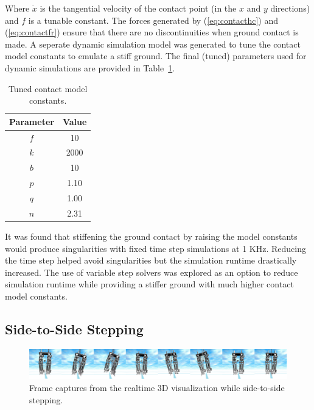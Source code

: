 Where $\dot x$ is the tangential velocity of the contact point (in the $x$ and $y$ directions) and $f$ is a tunable constant. The forces generated by (\ref{eq:contacthc}) and (\ref{eq:contactfr}) ensure that there are no discontinuities when ground contact is made. A seperate dynamic simulation model was generated to tune the contact model constants to emulate a stiff ground. The final (tuned) parameters used for dynamic simulations are provided in Table~\ref{tab:contactk}.

\begin{table}[!h]
  \centering
  \caption{Tuned contact model constants.}
    \begin{tabular}{cc}
    \addlinespace
    \toprule
    \textbf{Parameter} & \textbf{Value}\\
    \midrule
	$f$	&	10 \\
    $k$	&	2000 \\
    $b$	&	10 \\
    $p$	&	1.10 \\
    $q$  &	1.00 \\
    $n$	&	2.31 \\
    \bottomrule
    \end{tabular}
  \label{tab:contactk}
\end{table}

It was found that stiffening the ground contact by raising the model constants would produce singularities with fixed time step simulations at 1 KHz. Reducing the time step helped avoid singularities but the simulation runtime drastically increased. The use of variable step solvers was explored as an option to reduce simulation runtime while providing a stiffer ground with much higher contact model constants. 


\subsection{Side-to-Side Stepping} %
\label{sub:3d_simulations}

\begin{figure}[!h]
	\centering
    \includegraphics[scale=0.095]{fig/simulations/sidesequence.png}
  	\caption{Frame captures from the realtime 3D visualization while side-to-side stepping.}
	\label{fig:sidesequence}
\end{figure}

